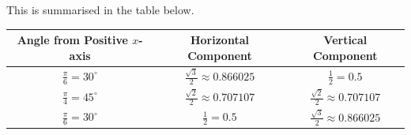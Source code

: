 \documentclass{article}
\begin{document}
This is summarised in the table below.
\begin{table}[H]
    \centering
    \begin{tabular}{c c c}
        \toprule
        \textbf{Angle from Positive \(x\)-axis} & \textbf{Horizontal Component}                  & \textbf{Vertical Component}                    \\
        \midrule
        \(\displaystyle\frac{\pi}{6} = 30^\circ\) & \(\displaystyle\frac{\sqrt{3}}{2} \approx \num{0.866025}\) & \(\displaystyle\frac{1}{2} = 0.5\)                         \\[2ex]
        \(\displaystyle\frac{\pi}{4} = 45^\circ\) & \(\displaystyle\frac{\sqrt{2}}{2} \approx \num{0.707107}\) & \(\displaystyle\frac{\sqrt{2}}{2} \approx \num{0.707107}\) \\[2ex]
        \(\displaystyle\frac{\pi}{6} = 30^\circ\) & \(\displaystyle\frac{1}{2} = 0.5\)                         & \(\displaystyle\frac{\sqrt{3}}{2} \approx \num{0.866025}\) \\[2ex]
        \bottomrule
    \end{tabular}
\end{table}
\end{document}
